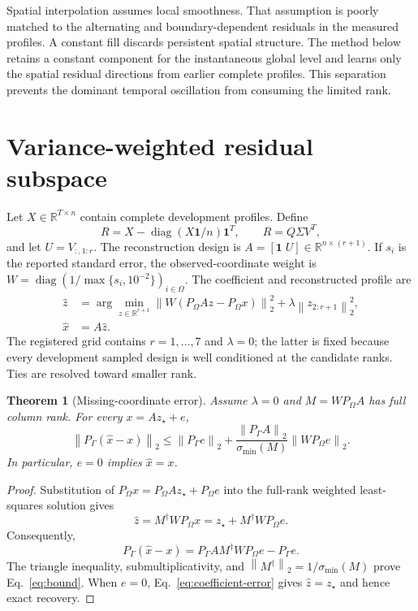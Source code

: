 \documentclass[10pt,letterpaper,twoside]{article}
\newcommand{\norm}[1]{\left\lVert#1\right\rVert}
\newcommand{\R}{\mathbb{R}}
\newtheorem{theorem}{Theorem}
\begin{document}
Spatial interpolation assumes local smoothness. That assumption is poorly
matched to the alternating and boundary-dependent residuals in the measured
profiles. A constant fill discards persistent spatial structure. The method
below retains a constant component for the instantaneous global level and
learns only the spatial residual directions from earlier complete profiles.
This separation prevents the dominant temporal oscillation from consuming the
limited rank.

\section{Variance-weighted residual subspace}

Let $X\in\R^{T\times n}$ contain complete development profiles. Define
\begin{equation}
 R=X-\operatorname{diag}(X\mathbf 1/n)\mathbf 1^T,
 \qquad R=Q\Sigma V^T,
 \label{eq:residual-svd}
\end{equation}
and let $U=V_{:,1:r}$. The reconstruction design is
$A=[\mathbf 1\;U]\in\R^{n\times(r+1)}$. If $s_i$ is the reported standard
error, the observed-coordinate weight is
$W=\operatorname{diag}(1/\max\{s_i,10^{-2}\})_{i\in\Omega}$.
The coefficient and reconstructed profile are
\begin{align}
 \widehat z
 &=\arg\min_{z\in\R^{r+1}}
   \norm{W(P_\Omega Az-P_\Omega x)}_2^2
   +\lambda\norm{z_{2:r+1}}_2^2,
 \label{eq:objective}\\
 \widehat x&=A\widehat z. \label{eq:reconstruction}
\end{align}
The registered grid contains $r=1,\ldots,7$ and $\lambda=0$; the latter is
fixed because every development sampled design is well conditioned at the
candidate ranks. Ties are resolved toward smaller rank.

\begin{theorem}[Missing-coordinate error]
\label{thm:error}
Assume $\lambda=0$ and $M=WP_\Omega A$ has full column rank. For every
$x=Az_\star+e$,
\begin{equation}
 \norm{P_\Gamma(\widehat x-x)}_2
 \le \norm{P_\Gamma e}_2
 +\frac{\norm{P_\Gamma A}_2}{\sigma_{\min}(M)}
       \norm{WP_\Omega e}_2 .
 \label{eq:bound}
\end{equation}
In particular, $e=0$ implies $\widehat x=x$.
\end{theorem}

\begin{proof}
Substitution of $P_\Omega x=P_\Omega Az_\star+P_\Omega e$ into the
full-rank weighted least-squares solution gives
\begin{equation}
 \widehat z=M^\dagger WP_\Omega x
 =z_\star+M^\dagger WP_\Omega e. \label{eq:coefficient-error}
\end{equation}
Consequently,
\begin{equation}
 P_\Gamma(\widehat x-x)
 =P_\Gamma A M^\dagger WP_\Omega e-P_\Gamma e.
\end{equation}
The triangle inequality, submultiplicativity, and
$\norm{M^\dagger}_2=1/\sigma_{\min}(M)$ prove Eq.~\eqref{eq:bound}.
When $e=0$, Eq.~\eqref{eq:coefficient-error} gives
$\widehat z=z_\star$ and hence exact recovery.
\end{proof}
\end{document}
